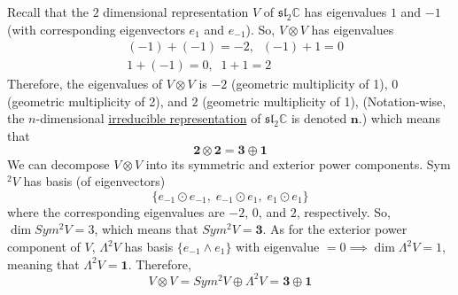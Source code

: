   \begin{example}
    \label{ex:weights-of-the-2-dimensional-representation}
    Recall that the $2$ dimensional representation $V$ of $\mathfrak{sl}_2 \mathbb{C}$ has eigenvalues $1$ and $-1$ (with corresponding eigenvectors $e_1$ and $e_{-1}$). So, $V \otimes V$ has eigenvalues 
    \begin{align*}
      & (-1) + (-1) = -2, \;\; (-1) + 1 = 0 \\
      & 1 + (-1) = 0, \;\; 1 + 1 = 2
    \end{align*}
    Therefore, the eigenvalues of $V \otimes V$ is $-2$ (geometric multiplicity of 1), $0$ (geometric multiplicity of 2), and $2$ (geometric multiplicity of 1), (Notation-wise, the $n$-dimensional \hyperref[def:irreducible-representation]{irreducible representation} of $\mathfrak{sl}_2 \mathbb{C}$ is denoted $\mathbf{n}$.) which means that
    \begin{equation}
      \mathbf{2} \otimes \mathbf{2} = \mathbf{3} \oplus \mathbf{1}
    \end{equation}
    We can decompose $V \otimes V$ into its symmetric and exterior power components. Sym$^2 V$ has basis (of eigenvectors)
    \begin{equation}
      \{e_{-1} \odot e_{-1}, \; e_{-1} \odot e_1, \; e_1 \odot e_1\}
    \end{equation}
    where the corresponding eigenvalues are $-2$, $0$, and $2$, respectively. So, $\dim{Sym^2 V} = 3$, which means that $Sym^2 V = \mathbf{3}$. As for the exterior power component of $V$, $\Lambda^2 V$ has basis $\{e_{-1} \wedge e_1\}$ with eigenvalue $= 0 \implies \dim{\Lambda^2 V} = 1$, meaning that $\Lambda^2 V = \mathbf{1}$. Therefore, 
    \begin{equation}
      V \otimes V = Sym^2 V \oplus \Lambda^2 V = \mathbf{3} \oplus \mathbf{1}
    \end{equation}
  \end{example}
